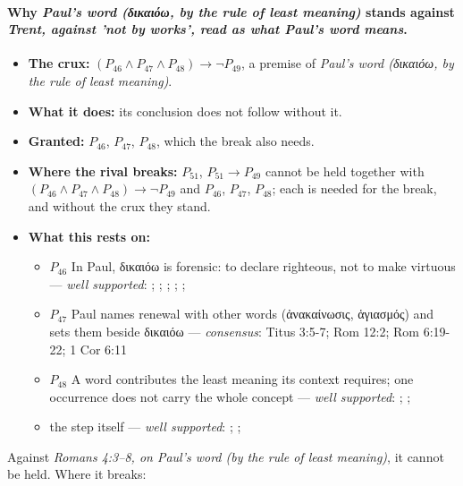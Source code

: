 \documentclass[11pt]{article}
\begin{document}
\paragraph{Why \emph{Paul's word (δικαιόω, by the rule of least meaning)} stands against \emph{Trent, against 'not by works', read as what Paul's word means}.}
\begin{itemize}
\item \textbf{The crux:} \((P_{46} \land P_{47} \land P_{48}) \rightarrow \lnot P_{49}\), a premise of \emph{Paul's word (δικαιόω, by the rule of least meaning)}.
\item \textbf{What it does:} its conclusion does not follow without it.
\item \textbf{Granted:} \(P_{46}\), \(P_{47}\), \(P_{48}\), which the break also needs.
\item \textbf{Where the rival breaks:} \(P_{51}\), \(P_{51} \rightarrow P_{49}\) cannot be held together with \((P_{46} \land P_{47} \land P_{48}) \rightarrow \lnot P_{49}\) and \(P_{46}\), \(P_{47}\), \(P_{48}\); each is needed for the break, and without the crux they stand.
\item \textbf{What this rests on:}
\begin{itemize}
\item \(P_{46}\) In Paul, δικαιόω is forensic: to declare righteous, not to make virtuous --- \emph{well supported}: \cite[s.v. δικαιόω]{bauer-danker-lexicon-2000}; \cite{morris-apostolic-preaching-1965}; \cite[p. 80]{moo-romans-1996}; \cite{irons-righteousness-of-god-2015}; \cite{wright-justification-2009}; \cite[ad loc. Rom 3:24]{fitzmyer-romans-1993}
\item \(P_{47}\) Paul names renewal with other words (ἀνακαίνωσις, ἁγιασμός) and sets them beside δικαιόω --- \emph{consensus}: Titus 3:5-7; Rom 12:2; Rom 6:19-22; 1 Cor 6:11
\item \(P_{48}\) A word contributes the least meaning its context requires; one occurrence does not carry the whole concept --- \emph{well supported}: \cite{silva-biblical-words-1994}; \cite{joos-semantic-axiom-1972}; \cite{barr-semantics-2004}
\item the step itself --- \emph{well supported}: \cite{silva-biblical-words-1994}; \cite[p. 80]{moo-romans-1996}; \cite{barr-semantics-2004}
\end{itemize}
\end{itemize}
Against \emph{Romans 4:3–8, on Paul's word (by the rule of least meaning)}, it cannot be held. Where it breaks:
\end{document}
